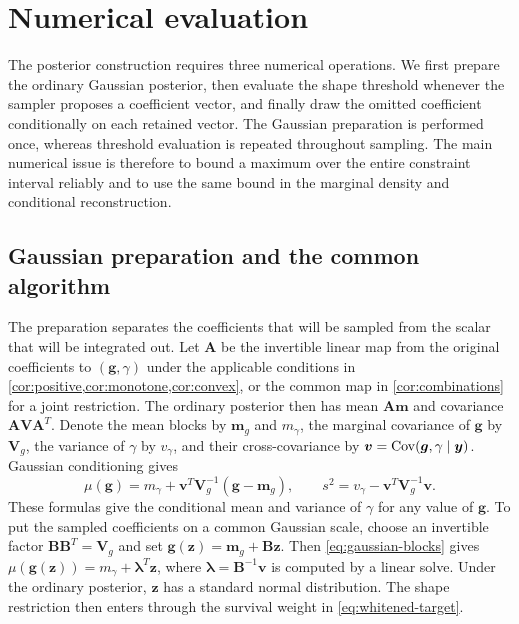 \section{Numerical evaluation}\label{app:numerical-evaluation}\label{sec:numerics}

The posterior construction requires three numerical operations. We
first prepare the ordinary Gaussian posterior, then evaluate the
shape threshold whenever the sampler proposes a coefficient vector,
and finally draw the omitted coefficient conditionally on each
retained vector. The Gaussian preparation is performed once, whereas
threshold evaluation is repeated throughout sampling. The main
numerical issue is therefore to bound a maximum over the entire
constraint interval reliably and to use the same bound in the
marginal density and conditional reconstruction.

\subsection{Gaussian preparation and the common algorithm}
\label{subsec:gaussian-preparation}

The preparation separates the coefficients that will be sampled
from the scalar that will be integrated out. Let $\boldsymbol A$ be
the invertible linear map from the original coefficients to
$(\boldsymbol g,\gamma)$ under the applicable conditions in
\cref{cor:positive,cor:monotone,cor:convex}, or the common map in
\cref{cor:combinations} for a joint restriction. The ordinary posterior
then has mean $\boldsymbol A\boldsymbol m$ and covariance
$\boldsymbol A\boldsymbol V\boldsymbol A^T$. Denote the mean blocks
by $\boldsymbol m_g$ and $m_\gamma$, the marginal covariance of
$\boldsymbol g$ by $\boldsymbol V_g$, the variance of $\gamma$ by
$v_\gamma$, and their cross-covariance by
$\boldsymbol v=\operatorname{Cov}(\boldsymbol g,\gamma\mid\boldsymbol y)$.
Gaussian conditioning gives
\begin{equation}\label{eq:gaussian-blocks}
 \mu(\boldsymbol g)=m_\gamma+
      \boldsymbol v^T\boldsymbol V_g^{-1}(\boldsymbol g-\boldsymbol m_g),
 \qquad s^2=v_\gamma-\boldsymbol v^T\boldsymbol V_g^{-1}\boldsymbol v.
\end{equation}
These formulas give the conditional mean and variance of $\gamma$
for any value of $\boldsymbol g$. To put the sampled coefficients
on a common Gaussian scale, choose an invertible factor
$\boldsymbol B\boldsymbol B^T=\boldsymbol V_g$ and set
$\boldsymbol g(\boldsymbol z)=\boldsymbol m_g+\boldsymbol B\boldsymbol z$.
Then \cref{eq:gaussian-blocks} gives
$\mu(\boldsymbol g(\boldsymbol z))=m_\gamma+\boldsymbol\lambda^T\boldsymbol z$,
where $\boldsymbol\lambda=\boldsymbol B^{-1}\boldsymbol v$ is
computed by a linear solve. Under the ordinary posterior,
$\boldsymbol z$ has a standard normal distribution. The shape
restriction then enters through the survival weight in
\cref{eq:whitened-target}.

